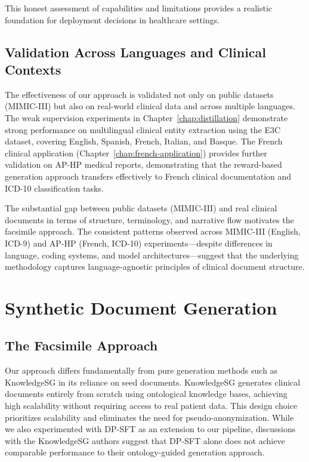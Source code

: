 This honest assessment of capabilities and limitations provides a realistic foundation for deployment decisions in healthcare settings.

\subsection{Validation Across Languages and Clinical Contexts}

The effectiveness of our approach is validated not only on public datasets (MIMIC-III) but also on real-world clinical data and across multiple languages.
The weak supervision experiments in Chapter~\ref{chap:distillation} demonstrate strong performance on multilingual clinical entity extraction using the E3C dataset, covering English, Spanish, French, Italian, and Basque.
The French clinical application (Chapter~\ref{chap:french-application}) provides further validation on AP-HP medical reports, demonstrating that the reward-based generation approach transfers effectively to French clinical documentation and ICD-10 classification tasks.

The substantial gap between public datasets (MIMIC-III) and real clinical documents in terms of structure, terminology, and narrative flow motivates the facsimile approach.
The consistent patterns observed across MIMIC-III (English, ICD-9) and AP-HP (French, ICD-10) experiments—despite differences in language, coding systems, and model architectures—suggest that the underlying methodology captures language-agnostic principles of clinical document structure.


\section{Synthetic Document Generation}


\subsection{The Facsimile Approach}

Our approach differs fundamentally from pure generation methods such as KnowledgeSG in its reliance on seed documents.
KnowledgeSG generates clinical documents entirely from scratch using ontological knowledge bases, achieving high scalability without requiring access to real patient data.
This design choice prioritizes scalability and eliminates the need for pseudo-anonymization.
While we also experimented with DP-SFT as an extension to our pipeline, discussions with the KnowledgeSG authors suggest that DP-SFT alone does not achieve comparable performance to their ontology-guided generation approach.


